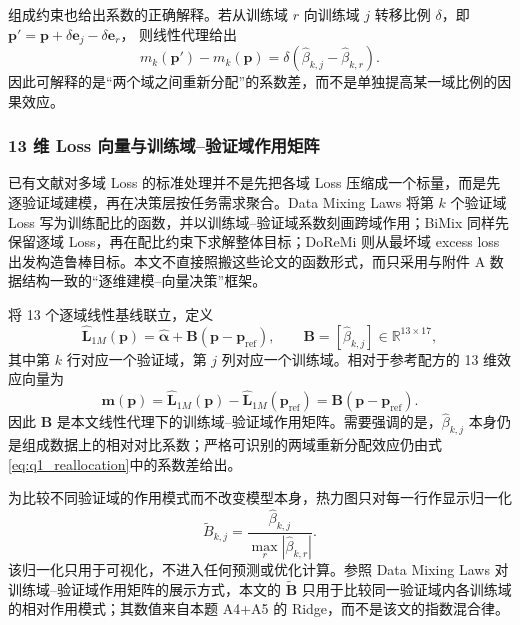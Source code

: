 组成约束也给出系数的正确解释。若从训练域 $r$ 向训练域 $j$ 转移比例 $\delta$，即
$\boldsymbol p'=\boldsymbol p+\delta\boldsymbol e_j-\delta\boldsymbol e_r$，
则线性代理给出
\begin{equation}
m_k(\boldsymbol p')-m_k(\boldsymbol p)
=
\delta(\widehat\beta_{k,j}-\widehat\beta_{k,r}).
\label{eq:q1_reallocation}
\end{equation}
因此可解释的是“两个域之间重新分配”的系数差，而不是单独提高某一域比例的因果效应。

\subsubsection{13 维 Loss 向量与训练域--验证域作用矩阵}

已有文献对多域 Loss 的标准处理并不是先把各域 Loss 压缩成一个标量，而是先逐验证域建模，再在决策层按任务需求聚合。Data Mixing Laws 将第 $k$ 个验证域 Loss 写为训练配比的函数，并以训练域--验证域系数刻画跨域作用；BiMix 同样先保留逐域 Loss，再在配比约束下求解整体目标；DoReMi 则从最坏域 excess loss 出发构造鲁棒目标\cite{datamixinglaws2025,bimix2025,doremi2023}。本文不直接照搬这些论文的函数形式，而只采用与附件 A 数据结构一致的“逐维建模--向量决策”框架。

将 13 个逐域线性基线联立，定义
\begin{equation}
\widehat{\boldsymbol L}_{1M}(\boldsymbol p)
=
\widehat{\boldsymbol\alpha}
+
\boldsymbol B
(\boldsymbol p-\boldsymbol p_{\mathrm{ref}}),
\qquad
\boldsymbol B=
[\widehat\beta_{k,j}]
\in\mathbb R^{13\times17},
\label{eq:q1_vector_loss}
\end{equation}
其中第 $k$ 行对应一个验证域，第 $j$ 列对应一个训练域。相对于参考配方的 13 维效应向量为
\begin{equation}
\boldsymbol m(\boldsymbol p)
=
\widehat{\boldsymbol L}_{1M}(\boldsymbol p)
-
\widehat{\boldsymbol L}_{1M}(\boldsymbol p_{\mathrm{ref}})
=
\boldsymbol B
(\boldsymbol p-\boldsymbol p_{\mathrm{ref}}).
\label{eq:q1_vector_effect}
\end{equation}
因此 $\boldsymbol B$ 是本文线性代理下的训练域--验证域作用矩阵。需要强调的是，$\widehat\beta_{k,j}$ 本身仍是组成数据上的相对对比系数；严格可识别的两域重新分配效应仍由式\eqref{eq:q1_reallocation}中的系数差给出。

为比较不同验证域的作用模式而不改变模型本身，热力图只对每一行作显示归一化
\begin{equation}
\widetilde B_{k,j}
=
\frac{\widehat\beta_{k,j}}
{\max_r|\widehat\beta_{k,r}|}.
\label{eq:q1_interaction_norm}
\end{equation}
该归一化只用于可视化，不进入任何预测或优化计算。参照 Data Mixing Laws 对训练域--验证域作用矩阵的展示方式\cite{datamixinglaws2025}，本文的 $\widetilde{\boldsymbol B}$ 只用于比较同一验证域内各训练域的相对作用模式；其数值来自本题 A4+A5 的 Ridge，而不是该文的指数混合律。

